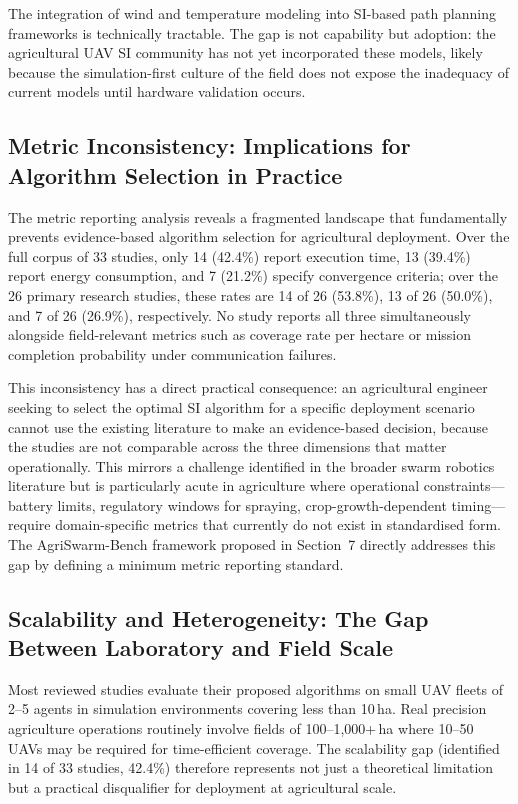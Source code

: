 \documentclass[review,3p,times]{elsarticle}
\begin{document}
The integration of wind and temperature modeling into SI-based path planning frameworks is technically tractable. The gap is not capability but adoption: the agricultural UAV SI community has not yet incorporated these models, likely because the simulation-first culture of the field does not expose the inadequacy of current models until hardware validation occurs.

\subsection{Metric Inconsistency: Implications for Algorithm Selection in Practice}
\label{sec:metrics_disc}

The metric reporting analysis reveals a fragmented landscape that fundamentally prevents evidence-based algorithm selection for agricultural deployment. Over the full corpus of 33 studies, only 14 (42.4\%) report execution time, 13 (39.4\%) report energy consumption, and 7 (21.2\%) specify convergence criteria; over the 26 primary research studies, these rates are 14 of 26 (53.8\%), 13 of 26 (50.0\%), and 7 of 26 (26.9\%), respectively. No study reports all three simultaneously alongside field-relevant metrics such as coverage rate per hectare or mission completion probability under communication failures.

This inconsistency has a direct practical consequence: an agricultural engineer seeking to select the optimal SI algorithm for a specific deployment scenario cannot use the existing literature to make an evidence-based decision, because the studies are not comparable across the three dimensions that matter operationally. This mirrors a challenge identified in the broader swarm robotics literature \cite{puente2022,sharma2022} but is particularly acute in agriculture where operational constraints---battery limits, regulatory windows for spraying, crop-growth-dependent timing---require domain-specific metrics that currently do not exist in standardised form. The AgriSwarm-Bench framework proposed in Section~7 directly addresses this gap by defining a minimum metric reporting standard.

\subsection{Scalability and Heterogeneity: The Gap Between Laboratory and Field Scale}

Most reviewed studies evaluate their proposed algorithms on small UAV fleets of 2--5 agents in simulation environments covering less than 10\,ha. Real precision agriculture operations routinely involve fields of 100--1,000+\,ha where 10--50 UAVs may be required for time-efficient coverage. The scalability gap (identified in 14 of 33 studies, 42.4\%) therefore represents not just a theoretical limitation but a practical disqualifier for deployment at agricultural scale.
\end{document}
